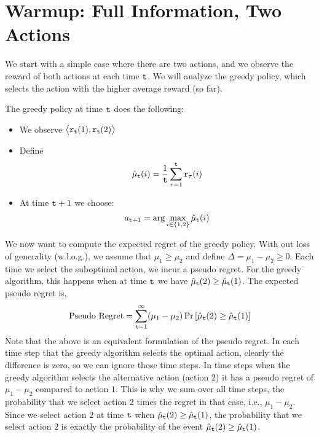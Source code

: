 \section{Warmup: Full Information, Two Actions }

We start with a simple case where there are two actions, and we
observe the reward of both actions at each time ${\tt t}$. We will analyze
the greedy policy, which selects the action with the higher average
reward (so far).

The greedy policy at time ${\tt t}$ does the following:
\begin{itemize}
\item We observe $\big\langle {\tt r}_{{\tt t}}(1),{\tt r}_{{\tt t}}(2)\big\rangle$
\item Define
\[
\hat{\mu}_{{\tt t}}(i)=\frac{1}{{\tt t}} \sum_{\tau=1}^{{\tt t}}{\tt r}_{\tau}(i)
\]
\item At time ${\tt t}+1$ we choose:
\[
a_{{\tt t}+1}=\arg\max_{i\in\{1,2\}}\hat{\mu}_{{\tt t}}(i)
\]
\end{itemize}

We now want to compute the expected regret of the greedy policy. 
With out loss of generality (w.l.o.g.), we assume that $\mu_{1}\ge\mu_{2}$ and define
$\Delta=\mu_{1}-\mu_{2}\ge0$. Each time we select the suboptimal action, we incur a pseudo regret. For the greedy algorithm, this happens when at time ${\tt t}$ we have $\hat{\mu}_{{\tt t}}(2)\ge \hat{\mu}_{{\tt t}}(1)$. The expected pseudo regret is,
\[
\text{Pseudo Regret}= \sum_{{\tt t}=1}^{\infty}(\mu_{1}-\mu_{2})
\Pr\left[\hat{\mu}_{{\tt t}}(2)\ge \hat{\mu}_{{\tt t}}(1)\right]
\]
Note that the above is an equivalent formulation of the pseudo regret. In each time step that the greedy algorithm selects the optimal action, clearly the difference is zero, so we can ignore those time steps. In time steps when the greedy algorithm selects the alternative action (action $2$) it has a pseudo regret of $\mu_1-\mu_2$ compared to action $1$. This is why we sum over all time steps, the probability that we select action $2$ times the regret in that case, i.e., $\mu_1-\mu_2$. Since we select action $2$ at time ${\tt t}$ when $\hat{\mu}_{{\tt t}}(2)\ge \hat{\mu}_{{\tt t}}(1)$, the probability that we select action $2$ is  exactly the probability of the event $\hat{\mu}_{{\tt t}}(2)\ge \hat{\mu}_{{\tt t}}(1)$.

